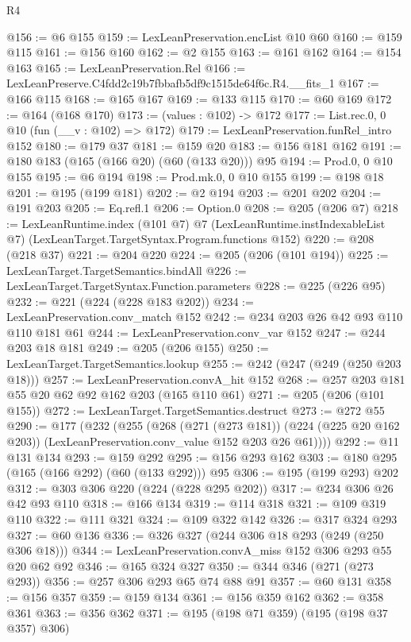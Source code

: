 \begin{lexlean}{R4}
\begin{coremodule}
@156 := @6 @155
@159 := LexLeanPreservation.encList @10 @60
@160 := @159 @115
@161 := @156 @160
@162 := @2 @155
@163 := @161 @162
@164 := @154 @163
@165 := LexLeanPreservation.Rel
@166 := LexLeanPreserve.C4fdd2c19b7fbbafb5df9c1515de64f6c.R4.__fits_1
@167 := @166 @115
@168 := @165 @167
@169 := @133 @115
@170 := @60 @169
@172 := @164 (@168 @170)
@173 := (values : @102) -> @172
@177 := List.rec.{0, 0} @10 (fun (__v : @102) => @172)
@179 := LexLeanPreservation.funRel_intro @152
@180 := @179 @37
@181 := @159 @20
@183 := @156 @181 @162
@191 := @180 @183 (@165 (@166 @20) (@60 (@133 @20))) @95
@194 := Prod.{0, 0} @10 @155
@195 := @6 @194
@198 := Prod.mk.{0, 0} @10 @155
@199 := @198 @18
@201 := @195 (@199 @181)
@202 := @2 @194
@203 := @201 @202
@204 := @191 @203
@205 := Eq.refl.{1}
@206 := Option.{0}
@208 := @205 (@206 @7)
@218 := LexLeanRuntime.index
    (@101 @7)
    @7
    (LexLeanRuntime.instIndexableList @7)
    (LexLeanTarget.TargetSyntax.Program.functions @152)
@220 := @208 (@218 @37)
@221 := @204 @220
@224 := @205 (@206 (@101 @194))
@225 := LexLeanTarget.TargetSemantics.bindAll
@226 := LexLeanTarget.TargetSyntax.Function.parameters
@228 := @225 (@226 @95)
@232 := @221 (@224 (@228 @183 @202))
@234 := LexLeanPreservation.conv_match @152
@242 := @234 @203 @26 @42 @93 @110 @110 @181 @61
@244 := LexLeanPreservation.conv_var @152
@247 := @244 @203 @18 @181
@249 := @205 (@206 @155)
@250 := LexLeanTarget.TargetSemantics.lookup
@255 := @242 (@247 (@249 (@250 @203 @18)))
@257 := LexLeanPreservation.convA_hit @152
@268 := @257 @203 @181 @55 @20 @62 @92 @162 @203 (@165 @110 @61)
@271 := @205 (@206 (@101 @155))
@272 := LexLeanTarget.TargetSemantics.destruct
@273 := @272 @55
@290 := @177
    (@232
      (@255
        (@268
          (@271 (@273 @181))
          (@224 (@225 @20 @162 @203))
          (LexLeanPreservation.conv_value @152 @203 @26 @61))))
@292 := @11 @131 @134
@293 := @159 @292
@295 := @156 @293 @162
@303 := @180 @295 (@165 (@166 @292) (@60 (@133 @292))) @95
@306 := @195 (@199 @293) @202
@312 := @303 @306 @220 (@224 (@228 @295 @202))
@317 := @234 @306 @26 @42 @93 @110
@318 := @166 @134
@319 := @114 @318
@321 := @109 @319 @110
@322 := @111 @321
@324 := @109 @322 @142
@326 := @317 @324 @293
@327 := @60 @136
@336 := @326 @327 (@244 @306 @18 @293 (@249 (@250 @306 @18)))
@344 := LexLeanPreservation.convA_miss @152 @306 @293 @55 @20 @62 @92
@346 := @165 @324 @327
@350 := @344 @346 (@271 (@273 @293))
@356 := @257 @306 @293 @65 @74 @88 @91
@357 := @60 @131
@358 := @156 @357
@359 := @159 @134
@361 := @156 @359 @162
@362 := @358 @361
@363 := @356 @362
@371 := @195 (@198 @71 @359) (@195 (@198 @37 @357) @306)

\end{coremodule}
\end{lexlean}
